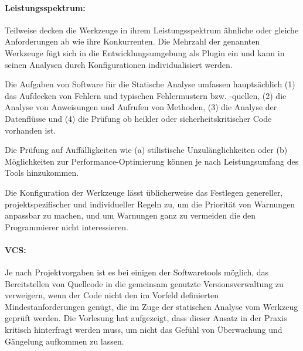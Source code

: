 \paragraph{Leistungsspektrum:} Teilweise decken die Werkzeuge in ihrem Leistungsspektrum ähnliche oder gleiche Anforderungen ab wie ihre Konkurrenten. Die Mehrzahl der genannten Werkzeuge fügt sich in die Entwicklungsumgebung als Plugin ein und kann in seinen Analysen durch Konfigurationen individualisiert werden. 

Die Aufgaben von Software für die Statische Analyse umfassen hauptsächlich (1) das Aufdecken von Fehlern und typischen Fehlermustern bzw. -quellen, (2) die Analyse von Anweisungen und Aufrufen von Methoden, (3) die Analyse der Datenflüsse und (4) die Prüfung ob heikler oder sicherheitskritischer Code vorhanden ist. 

Die Prüfung auf Auffälligkeiten wie (a) stilistische Unzulänglichkeiten oder (b) Möglichkeiten zur Performance-Optimierung können je nach Leistungsumfang des Tools hinzukommen.

Die Konfiguration der Werkzeuge lässt üblicherweise das Festlegen genereller, projektspezifischer und individueller Regeln zu,   um die Priorität von Warnungen anpassbar zu machen, und um Warnungen ganz zu vermeiden die den Programmierer nicht interessieren.

\paragraph{VCS:} Je nach Projektvorgaben ist es bei einigen der Softwaretools möglich, das Bereitstellen von Quellcode in die gemeinsam genutzte Versionsverwaltung zu verweigern, wenn der Code nicht den im Vorfeld definierten Mindestanforderungen genügt, die im Zuge der statischen Analyse vom Werkzeug geprüft werden. Die Vorlesung hat aufgezeigt, dass dieser Ansatz in der Praxis kritisch hinterfragt werden muss, um nicht das Gefühl von Überwachung und Gängelung aufkommen zu lassen.
